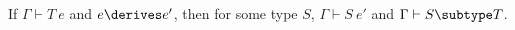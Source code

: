 % 
% 
% 
% 
% 


\begin{theorem} 
\label{preservation}
If $\Gamma \vdash T\ e$ and $e \derives e'$, then for some type $S$,
$\Gamma \vdash S\ e'$ and $\Gamma \vdash S \subtype T$.
\end{theorem}

